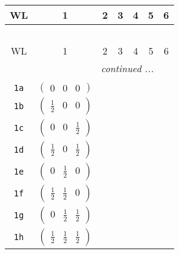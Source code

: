 \documentclass[fleqn,9pt,landscape]{jsarticle}
\begin{document}
\begin{center}
\renewcommand{\arraystretch}{1.2}
\begin{longtable}{ccccccc}
 \hline \hline
WL & 1 & 2 & 3 & 4 & 5 & 6 \\ \hline \endfirsthead

\multicolumn{6}{l}{\tablename\ \thetable{}} \\
 \hline \hline
WL & 1 & 2 & 3 & 4 & 5 & 6 \\ \hline \endhead

 \hline \hline
\multicolumn{6}{r}{\footnotesize\it continued ...} \\ \endfoot

 \hline \hline
\multicolumn{6}{r}{} \\ \endlastfoot

{\tt 1a} & $ \begin{pmatrix} 0 & 0 & 0 \end{pmatrix} $ & $  $ & $  $ & $  $ & $  $ & $  $ \\ \hline
{\tt 1b} & $ \begin{pmatrix} \frac{1}{2} & 0 & 0 \end{pmatrix} $ & $  $ & $  $ & $  $ & $  $ & $  $ \\ \hline
{\tt 1c} & $ \begin{pmatrix} 0 & 0 & \frac{1}{2} \end{pmatrix} $ & $  $ & $  $ & $  $ & $  $ & $  $ \\ \hline
{\tt 1d} & $ \begin{pmatrix} \frac{1}{2} & 0 & \frac{1}{2} \end{pmatrix} $ & $  $ & $  $ & $  $ & $  $ & $  $ \\ \hline
{\tt 1e} & $ \begin{pmatrix} 0 & \frac{1}{2} & 0 \end{pmatrix} $ & $  $ & $  $ & $  $ & $  $ & $  $ \\ \hline
{\tt 1f} & $ \begin{pmatrix} \frac{1}{2} & \frac{1}{2} & 0 \end{pmatrix} $ & $  $ & $  $ & $  $ & $  $ & $  $ \\ \hline
{\tt 1g} & $ \begin{pmatrix} 0 & \frac{1}{2} & \frac{1}{2} \end{pmatrix} $ & $  $ & $  $ & $  $ & $  $ & $  $ \\ \hline
{\tt 1h} & $ \begin{pmatrix} \frac{1}{2} & \frac{1}{2} & \frac{1}{2} \end{pmatrix} $ & $  $ & $  $ & $  $ & $  $ & $  $ \\ \hline

\end{longtable}
\end{center}
\end{document}
